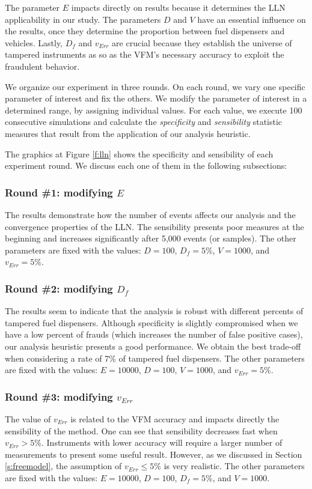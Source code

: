 \documentclass[sigplan]{acmart}
\begin{document}
The parameter $E$ impacts directly on results because it determines the LLN applicability in our study.
The parameters $D$ and $V$ have an essential influence on the results, once they determine the proportion between fuel dispensers and vehicles.
Lastly, $D_f$ and $v_{Err}$ are crucial because they establish the universe of tampered instruments as so as the VFM's necessary accuracy to exploit the fraudulent behavior.

We organize our experiment in three rounds.
On each round, we vary one specific parameter of interest and fix the others.
We modify the parameter of interest in a determined range, by assigning individual values.
For each value, we execute 100 consecutive simulations and calculate the \emph{specificity} and \emph{sensibility} statistic measures that result from the application of our analysis heuristic.

The graphics at Figure \ref{f:lln} shows the specificity and sensibility of each experiment round.
We discuss each one of them in the following subsections:

\subsubsection{Round \#1: modifying $E$}
The results demonstrate how the number of events affects our analysis and the convergence properties of the LLN.
The sensibility presents poor measures at the beginning and increases significantly after 5,000 events (or samples).
The other parameters are fixed with the values: $D = 100$, $D_f = 5\%$, $V = 1000$, and $v_{Err} = 5\%$.

\subsubsection{Round \#2: modifying $D_f$}
The results seem to indicate that the analysis is robust with different percents of tampered fuel dispensers.
Although specificity is slightly compromised when we have a low percent of frauds (which increases the number of false positive cases), our analysis heuristic presents a good performance.
We obtain the best trade-off when considering a rate of 7\% of tampered fuel dispensers.
The other parameters are fixed with the values: $E = 10000$, $D = 100$, $V = 1000$, and $v_{Err} = 5\%$.

\subsubsection{Round \#3: modifying $v_{Err}$}
The value of $v_{Err}$ is related to the VFM accuracy and impacts directly the sensibility of the method.
One can see that sensibility decreases fast when $v_{Err} > 5\%$.
Instruments with lower accuracy will require a larger number of measurements to present some useful result.
However, as we discussed in Section \ref{s:freemodel}, the assumption of $v_{Err} \leq 5\%$ is very realistic.
The other parameters are fixed with the values: $E = 10000$, $D = 100$, $D_f = 5\%$, and $V = 1000$.
\end{document}
